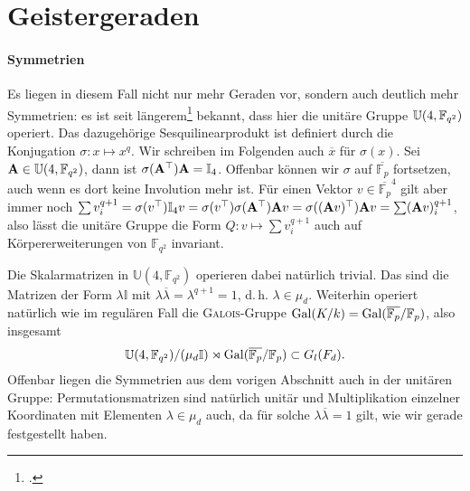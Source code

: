 \section{Geistergeraden}
\paragraph{Symmetrien} Es liegen in diesem Fall nicht nur mehr Geraden vor, sondern auch deutlich mehr Symmetrien: es ist seit längerem\footcite[siehe u.\,a.][S.~102]{Tate} bekannt, dass hier die unitäre Gruppe $\mathbb U(4,\mathbb F_{q^2})$ operiert. Das dazugehörige Sesquilinearprodukt ist definiert durch die Konjugation $\sigma \colon x \mapsto x^q$. Wir schreiben im Folgenden auch $\overline x$ für $\sigma(x)$. Sei $\mathbf{A} \in \mathbb U(4,\mathbb F_{q^2})$, dann ist $\sigma(\mathbf{A}^\top) \mathbf{A} = \mathbb I_4$. Offenbar können wir $\sigma$ auf $\overline{\mathbb F_p}$ fortsetzen, auch wenn es dort keine Involution mehr ist. Für einen Vektor $v \in \overline{\mathbb F_p}^4$ gilt aber immer noch $\sum v_i^{q+1} = \sigma(v^\top) \mathbb I_4 v = \sigma(v^\top) \sigma(\mathbf{A}^\top) \mathbf{A} v = \sigma((\mathbf{A}v)^\top) \mathbf{A}v = \sum (\mathbf{A}v)_i^{q+1}$, also lässt die unitäre Gruppe die Form $Q: v \mapsto \sum v_i^{q+1}$ auch auf Körpererweiterungen von $\mathbb F_{q^2}$ invariant.

Die Skalarmatrizen in $\mathbb U(4, \mathbb F_{q^2})$ operieren dabei natürlich trivial. Das sind die Matrizen der Form $\lambda \mathbb I$ mit $\lambda \overline{\lambda} = \lambda^{q+1} = 1$, d.\,h. $\lambda \in \mu_d$. Weiterhin operiert natürlich wie im regulären Fall die \textsc{Galois}-Gruppe $\Gal K/k = \Gal \overline{\mathbb F_p}/{\mathbb F_p}$, also insgesamt
\begin{equation}
\Unit 4{\mathbb F_{q^2}}/(\mu_d \mathbb I) \rtimes \Gal \overline{\mathbb F_p}/{\mathbb F_p} \subset G_l(F_d).
\end{equation}
Offenbar liegen die Symmetrien aus dem vorigen Abschnitt auch in der unitären Gruppe: Permutationsmatrizen sind natürlich unitär und Multiplikation einzelner Koordinaten mit Elementen $\lambda \in \mu_d$ auch, da für solche $\lambda \overline{\lambda}=1$ gilt, wie wir gerade festgestellt haben.

